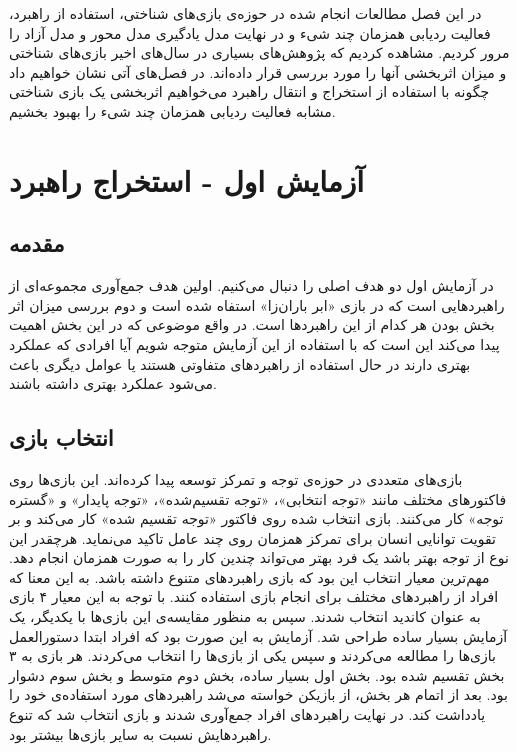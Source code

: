 \documentclass[twoside, a4paper,11pt]{book}
\numberwithin{equation}{chapter}
\numberwithin{table}{chapter}
\numberwithin{figure}{chapter}
\numberwithin{equation}{chapter}
\begin{document}
در این فصل مطالعات انجام شده در حوزه‌ی بازی‌های شناختی، استفاده از راهبرد، فعالیت ردیابی همزمان چند شیء و در نهایت مدل یادگیری مدل محور و مدل آزاد را مرور کردیم. مشاهده کردیم که پژوهش‌های بسیاری در سال‌های اخیر بازی‌های شناختی و میزان اثربخشی آنها را مورد بررسی قرار داده‌اند. در فصل‌های آتی نشان خواهیم داد چگونه با استفاده از استخراج و انتقال راهبرد می‌خواهیم اثربخشی یک بازی شناختی مشابه فعالیت ردیابی همزمان چند شیء را بهبود بخشیم.



\chapter{آزمایش اول - استخراج راهبرد}
\label{chapter:partOneExtraction}
\thispagestyle{plain}

\section{مقدمه}
در آزمایش اول دو هدف اصلی را دنبال می‌کنیم. اولین هدف جمع‌آوری مجموعه‌ای از راهبردهایی است که در بازی «ابر باران‌زا» استفاه شده است و دوم بررسی میزان اثر بخش بودن هر کدام از این راهبردها است. در واقع موضوعی که در این بخش اهمیت پیدا می‌کند این است که با استفاده از این آزمایش متوجه شویم آیا افرادی که عملکرد بهتری دارند در حال استفاده از راهبردهای متفاوتی هستند یا عوامل دیگری باعث می‌شود عملکرد بهتری داشته باشند.

\section{انتخاب بازی}

بازی‌های متعددی در حوزه‌ی توجه و تمرکز توسعه پیدا کرده‌اند. این بازی‌ها روی فاکتورهای مختلف مانند «توجه انتخابی»، «توجه تقسیم‌شده»، «توجه پایدار» و «گستره توجه» کار می‌کنند. بازی انتخاب شده روی فاکتور «توجه تقسیم شده» کار می‌کند و بر تقویت توانایی انسان برای تمرکز همزمان روی چند عامل تاکید می‌نماید. هرچقدر این نوع از توجه بهتر باشد یک فرد بهتر می‌تواند چندین کار را به صورت همزمان انجام دهد. 
مهم‌ترین معیار انتخاب این بود که بازی راهبرد‌های متنوع داشته باشد. به این معنا که افراد از راهبردهای مختلف برای انجام بازی استفاده کنند. با توجه به این معیار ۴ بازی به عنوان کاندید انتخاب شدند. سپس به منظور مقایسه‌ی این بازی‌ها با یکدیگر، یک آزمایش بسیار ساده طراحی شد. آزمایش به این صورت بود که افراد ابتدا دستورالعمل بازی‌ها را مطالعه می‌کردند و سپس یکی از بازی‌ها را انتخاب می‌کردند. هر بازی به ۳ بخش تقسیم شده بود. بخش اول بسیار ساده، بخش دوم متوسط و بخش سوم دشوار بود. بعد از اتمام هر بخش، از بازیکن خواسته می‌شد راهبردهای مورد استفاده‌ی خود را یادداشت کند. در نهایت راهبردهای افراد جمع‌آوری شدند و بازی انتخاب شد که تنوع راهبردهایش نسبت به سایر بازی‌ها بیشتر بود.
\end{document}
